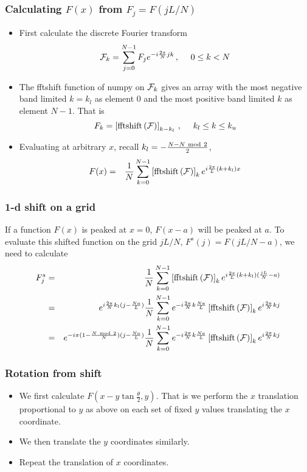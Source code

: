 \documentclass{beamer}
\begin{document}
\begin{frame}
\frametitle{Calculating $F(x)$ from $F_j=F(jL/N)$}
\begin{itemize}
\item
First calculate the discrete Fourier transform
\begin{equation}
{\cal F}_k  = \sum_{j=0}^{N-1} F_j e^{-i\frac{2\pi}{N} jk}\,,
\ \ \ \ 0 \le k < N
\end{equation}
\item
The fftshift function of numpy on ${\cal F}_k$ gives an array 
with the most negative band limited $k = k_l$ as element 0 and
the most positive band limited $k$ as element $N-1$. That is
\begin{equation}
F_k = \left [{\rm fftshift}\left ({\cal F}\right)\right ]_{k-k_l}\,,
\ \ \ \ k_l \leq k \leq k_u
\end{equation}
\item
Evaluating at arbitrary $x$, recall $k_l = -\frac{N- N~{\rm mod}~2}{2}$,
\begin{eqnarray*}
F(x) &=& \frac{1}{N}\sum_{k=0}^{N-1} \left [{\rm fftshift}\left({\cal F}\right)
\right ]_k e^{i\frac{2\pi}{L} (k+k_l) x}
\end{eqnarray*}

\end{itemize}
\end{frame}

\begin{frame}
\frametitle{1-d shift on a grid}
If a function $F(x)$ is peaked at $x=0$, $F(x-a)$ will be peaked at
$a$. To evaluate this shifted function on the grid $jL/N$,
$F^s(j) = F(jL/N-a)$, we need to calculate
\begin{eqnarray*}
F^s_j &=&
\frac{1}{N}\sum_{k=0}^{N-1}
\left [{\rm fftshift}\left({\cal F}\right) \right ]_k
e^{i\frac{2\pi}{L} (k+k_l) (\frac{jL}{N}-a)}
\nonumber\\
&=&
e^{i\frac{2\pi}{N} k_l (j-\frac{Na}{L})}
\frac{1}{N} \sum_{k=0}^{N-1}
e^{-i\frac{2\pi}{N} k \frac{Na}{L}}
\left [{\rm fftshift}\left({\cal F}\right) \right ]_k
e^{i \frac{2\pi}{N} kj}
\nonumber\\
&=&
e^{-i\pi (1-\frac{N~{\rm mod}~2}{N}) (j-\frac{Na}{L})}
\frac{1}{N} \sum_{k=0}^{N-1}
e^{-i\frac{2\pi}{N} k \frac{Na}{L}}
\left [{\rm fftshift}\left({\cal F}\right) \right ]_k
e^{i \frac{2\pi}{N} kj}
\end{eqnarray*}
\end{frame}
\begin{frame}
\frametitle{Rotation from shift}
\begin{itemize}
\item
We first calculate $F(x-y\tan\frac{\theta}{2},y)$. That is we 
perform the $x$ translation proportional to $y$
as above on each set of fixed $y$ values
translating the $x$ coordinate.
\item
We then translate the $y$ coordinates similarly.
\item
Repeat the translation of $x$ coordinates.

\end{itemize}
\end{frame}
\end{document}
